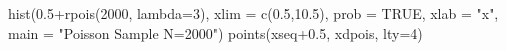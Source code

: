 \begin{Schunk}
\begin{Sinput}
  hist(0.5+rpois(2000, lambda=3), xlim = c(0.5,10.5), prob = TRUE, xlab = "x", main = "Poisson Sample N=2000")
   points(xseq+0.5, xdpois, lty=4)
\end{Sinput}
\end{Schunk}
